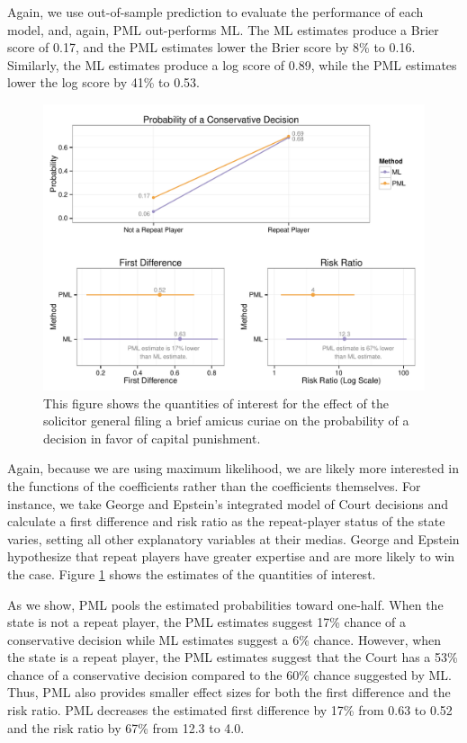 \documentclass[12pt]{article}
\begin{document}
Again, we use out-of-sample prediction to evaluate the performance of each model, and, again, PML out-performs ML.
The ML estimates produce a Brier score of 0.17, and the PML estimates lower the Brier score by 8\% to 0.16.
Similarly, the ML estimates produce a log score of 0.89, while the PML estimates lower the log score by 41\% to 0.53.

\begin{figure}[h]
\begin{center}
\includegraphics[width = \textwidth]{figs/ge-qis.pdf}
\caption{This figure shows the quantities of interest for the effect of the solicitor general filing a brief amicus curiae on the probability of a decision in favor of capital punishment.}\label{fig:ge-qis}
\end{center}
\end{figure}

Again, because we are using maximum likelihood, we are likely more interested in the functions of the coefficients rather than the coefficients themselves.
For instance, we take George and Epstein's integrated model of Court decisions and calculate a first difference and risk ratio as the repeat-player status of the state varies, setting all other explanatory variables at their medias.
George and Epstein hypothesize that repeat players have greater expertise and are more likely to win the case.
Figure \ref{fig:ge-qis} shows the estimates of the quantities of interest.

As we show, PML pools the estimated probabilities toward one-half. When the state is not a repeat player, the PML estimates suggest 17\% chance of a conservative decision while ML estimates suggest a 6\% chance.
However, when the state is a repeat player, the PML estimates suggest that the Court has a 53\% chance of a conservative decision compared to the 60\% chance suggested by ML.
Thus, PML also provides smaller effect sizes for both the first difference and the risk ratio.
PML decreases the estimated first difference by 17\% from 0.63 to 0.52 and the risk ratio by 67\% from 12.3 to 4.0.
\end{document}
